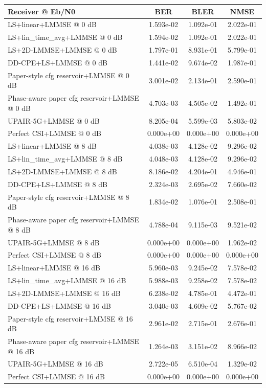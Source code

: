 \begin{tabular}{lccc}
\toprule
Receiver @ Eb/N0 & BER & BLER & NMSE \\
\midrule
LS+linear+LMMSE @ 0 dB & 1.593e-02 & 1.092e-01 & 2.022e-01 \\
LS+lin_time_avg+LMMSE @ 0 dB & 1.594e-02 & 1.092e-01 & 2.022e-01 \\
LS+2D-LMMSE+LMMSE @ 0 dB & 1.797e-01 & 8.931e-01 & 5.799e-01 \\
DD-CPE+LS+LMMSE @ 0 dB & 1.441e-02 & 9.674e-02 & 1.987e-01 \\
Paper-style cfg reservoir+LMMSE @ 0 dB & 3.001e-02 & 2.134e-01 & 2.590e-01 \\
Phase-aware paper cfg reservoir+LMMSE @ 0 dB & 4.703e-03 & 4.505e-02 & 1.492e-01 \\
UPAIR-5G+LMMSE @ 0 dB & 8.205e-04 & 5.599e-03 & 5.803e-02 \\
Perfect CSI+LMMSE @ 0 dB & 0.000e+00 & 0.000e+00 & 0.000e+00 \\
\midrule
LS+linear+LMMSE @ 8 dB & 4.038e-03 & 4.128e-02 & 9.296e-02 \\
LS+lin_time_avg+LMMSE @ 8 dB & 4.048e-03 & 4.128e-02 & 9.296e-02 \\
LS+2D-LMMSE+LMMSE @ 8 dB & 8.186e-02 & 4.204e-01 & 4.946e-01 \\
DD-CPE+LS+LMMSE @ 8 dB & 2.324e-03 & 2.695e-02 & 7.660e-02 \\
Paper-style cfg reservoir+LMMSE @ 8 dB & 1.834e-02 & 1.076e-01 & 2.508e-01 \\
Phase-aware paper cfg reservoir+LMMSE @ 8 dB & 4.788e-04 & 9.115e-03 & 9.521e-02 \\
UPAIR-5G+LMMSE @ 8 dB & 0.000e+00 & 0.000e+00 & 1.962e-02 \\
Perfect CSI+LMMSE @ 8 dB & 0.000e+00 & 0.000e+00 & 0.000e+00 \\
\midrule
LS+linear+LMMSE @ 16 dB & 5.960e-03 & 9.245e-02 & 7.578e-02 \\
LS+lin_time_avg+LMMSE @ 16 dB & 5.988e-03 & 9.258e-02 & 7.578e-02 \\
LS+2D-LMMSE+LMMSE @ 16 dB & 6.238e-02 & 4.785e-01 & 4.472e-01 \\
DD-CPE+LS+LMMSE @ 16 dB & 3.040e-03 & 4.609e-02 & 5.767e-02 \\
Paper-style cfg reservoir+LMMSE @ 16 dB & 2.961e-02 & 2.715e-01 & 2.676e-01 \\
Phase-aware paper cfg reservoir+LMMSE @ 16 dB & 1.264e-03 & 3.151e-02 & 8.966e-02 \\
UPAIR-5G+LMMSE @ 16 dB & 2.722e-05 & 6.510e-04 & 1.329e-02 \\
Perfect CSI+LMMSE @ 16 dB & 0.000e+00 & 0.000e+00 & 0.000e+00 \\
\bottomrule
\end{tabular}